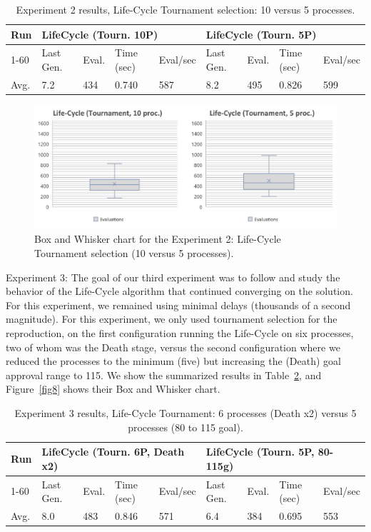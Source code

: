 \documentclass[runningheads]{llncs}
\begin{document}
\begin{table}[]
    \centering        
    \caption{Experiment 2 results, Life-Cycle Tournament selection: 10 versus 5 processes.}\label{tab3}
    \begin{tabular}{|l|l|l|l|l|l|l|l|l|}
    \hline
    Run & \multicolumn{4}{l|}{LifeCycle (Tourn. 10P)} & \multicolumn{4}{l|}{LifeCycle (Tourn. 5P)} \\ \hline
    1-60 & Last Gen. & Eval. & Time (sec) & Eval/sec & Last Gen. & Eval. & Time (sec) & Eval/sec \\ \hline
    Avg. & 7.2 & 434 & 0.740 & 587 & 8.2 & 495 & 0.826 & 599 \\ \hline
    \end{tabular}
    \end{table}

\begin{figure}
    \includegraphics[width=\textwidth]{img/fig7_experiment02_chart.pdf}
    \caption{Box and Whisker chart for the Experiment 2: Life-Cycle Tournament selection (10 versus 5 processes).} \label{fig7}
    \end{figure}


Experiment 3: The goal of our third experiment was to follow and study the
behavior of the Life-Cycle algorithm that continued converging on the solution.
For this experiment, we remained using minimal delays (thousands of a second
magnitude). For this experiment, we only used tournament selection for the
reproduction, on the first configuration running the Life-Cycle on six
processes, two of whom was the Death stage, versus the second configuration
where we reduced the processes to the minimum (five) but increasing the (Death)
goal approval range to 115. We show the summarized results in Table~\ref{tab4}, and
Figure~\ref{fig8} shows their Box and Whisker chart.

\begin{table}[]
    \centering        
    \caption{Experiment 3 results, Life-Cycle Tournament: 6 processes (Death x2) versus 5 processes (80 to 115 goal).}\label{tab4}
    \begin{tabular}{|l|l|l|l|l|l|l|l|l|}
    \hline
    Run & \multicolumn{4}{l|}{LifeCycle (Tourn. 6P, Death x2)} & \multicolumn{4}{l|}{LifeCycle (Tourn. 5P, 80-115g)} \\ \hline
    1-60 & Last Gen. & Eval. & Time (sec) & Eval/sec & Last Gen. & Eval. & Time (sec) & Eval/sec \\ \hline
    Avg. & 8.0 & 483 & 0.846 & 571 & 6.4 & 384 & 0.695 & 553 \\ \hline
    \end{tabular}
    \end{table}
\end{document}
